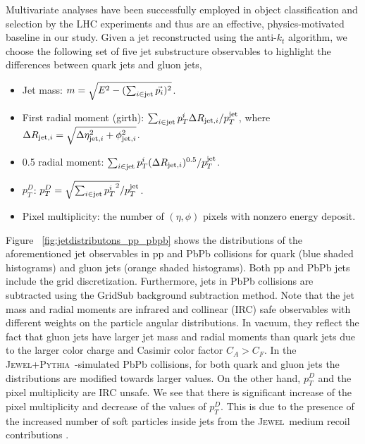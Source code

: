 \documentclass[notoc]{JHEP3}
\newcommand{\jw}{\textsc{Jewel}~}
\newcommand{\jwpy}{\textsc{Jewel+Pythia}~}
\begin{document}
Multivariate analyses have been successfully employed in object classification and selection by the LHC experiments \cite{} and thus are an effective, physics-motivated baseline in our study. Given a jet reconstructed using the anti-$k_{t}$ algorithm, we choose the following set of five jet substructure observables \cite{Gallicchio:2012ez} to highlight the differences between quark jets and gluon jets,
	\begin{itemize}
		\item Jet mass: $m = \sqrt{E^{2} - (\sum_{i\in {\rm jet}} \vec{p_i})^2}$.
        		\item First radial moment (girth): $\sum_{i \in {\rm jet}} p^i_{T} \Delta R_{{\rm jet}, i}/p^{\rm jet}_{T}$, where $\Delta R_{{\rm jet}, i}=\sqrt{\Delta \eta^2_{{\rm jet}, i}+\phi^2_{{\rm jet}, i}}$.
		\item 0.5 radial moment:  $\sum_{i \in {\rm jet}} p^i_{T} (\Delta R_{{\rm jet}, i})^{0.5}/p^{\rm jet}_{T}$.
        		\item $p_{T}^{D}$: $p^{D}_{T} = \sqrt{\sum_{i \in {\rm jet}} {p^{i}_{T}}^2}/p^{\rm jet}_{T}$.
        		\item Pixel multiplicity: the number of $(\eta,\phi)$ pixels with nonzero energy deposit. %
	\end{itemize}

Figure ~\ref{fig:jetdistributons_pp_pbpb} shows the distributions of the aforementioned jet observables in pp and PbPb collisions for quark (blue shaded histograms) and gluon jets (orange shaded histograms). Both pp and PbPb jets include the grid discretization. Furthermore, jets in PbPb collisions are subtracted using the GridSub background subtraction method. Note that the jet mass and radial moments are infrared and collinear (IRC) safe observables with different weights on the particle angular distributions. In vacuum, they reflect the fact that gluon jets have larger jet mass and radial moments than quark jets due to the larger color charge and Casimir color factor $C_A>C_F$. In the \jwpy-simulated PbPb collisions, for both quark and gluon jets the distributions are modified towards larger values. On the other hand, $p_T^D$ and the pixel multiplicity are IRC unsafe. We see that there is significant increase of the pixel multiplicity and decrease of the values of $p_T^D$. This is due to the presence of the increased number of soft particles inside jets from the \jw medium recoil contributions \cite{KunnawalkamElayavalli:2017hxo}.
\end{document}
